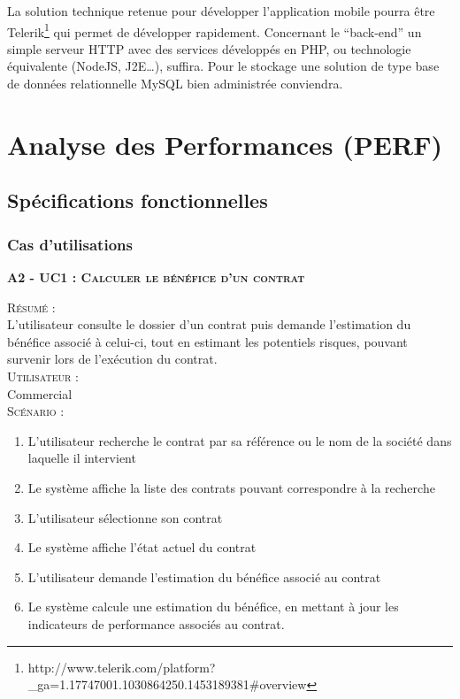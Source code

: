 La solution technique retenue pour développer l’application mobile pourra être Telerik\footnote{http://www.telerik.com/platform?\_ga=1.17747001.1030864250.1453189381\#overview} qui permet de développer rapidement. Concernant le “back-end” un simple serveur HTTP avec des services développés en PHP, ou technologie équivalente (NodeJS, J2E…), suffira. Pour le stockage une solution de type base de données relationnelle MySQL bien administrée conviendra.

\section{Analyse des Performances (PERF)}%

\subsection{Spécifications fonctionnelles}

\subsubsection{Cas d’utilisations}

\noindent\textsc{\bf{A2 - UC1 :} Calculer le bénéfice d’un contrat}
\begin{shaded}
\noindent\textsc{Résumé :}\\

L’utilisateur consulte le dossier d’un contrat puis demande l’estimation du bénéfice associé à celui-ci, tout en estimant les potentiels risques, pouvant survenir lors de l’exécution du contrat. \\

\noindent\textsc{Utilisateur :} \\

Commercial \\

\noindent\textsc{Scénario :} \\
\begin{enumerate}
    \item L’utilisateur recherche le contrat par sa référence ou le nom de la société dans laquelle il intervient
    \item Le système affiche la liste des contrats pouvant correspondre à la recherche
    \item L’utilisateur sélectionne son contrat
    \item Le système affiche l’état actuel du contrat
    \item L’utilisateur demande l’estimation du bénéfice associé au contrat
    \item Le système calcule une estimation du bénéfice, en mettant à jour les indicateurs de performance associés au contrat.
\end{enumerate}
\end{shaded}


